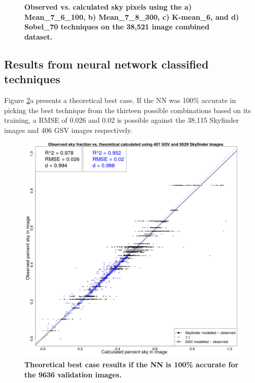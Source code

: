 \documentclass[final,3p,times,authoryear]{elsarticle}
\begin{document}
\begin{figure}
\caption{\textbf{Observed vs. calculated sky pixels using the a) Mean\_7\_6\_100, b) Mean\_7\_8\_300, c) K-mean\_6, and d) Sobel\_70 techniques on the 38,521 image combined dataset.} }
\label{fig:errorallcombined}
\end{figure}

\subsection{Results from neural network classified techniques}\label{sec:resultsnn}
Figure \ref{fig:errorplots}a presents a theoretical best case. If the NN was 100\% accurate in picking the best technique from the thirteen possible combinations based on its training, a RMSE of 0.026 and 0.02 is possible against the 38,115 Skyfinder images and 406 GSV images respectively. 

\begin{figure}
\centering
\includegraphics[scale=0.15]{Images/ErrorPlots1Combined.png}

\caption{\textbf{
Theoretical best case results if the NN is 100\% accurate for the 9636 validation images. 
}}
\label{fig:errorplotscntk} \label{fig:errorplots}
\end{figure}
\end{document}
